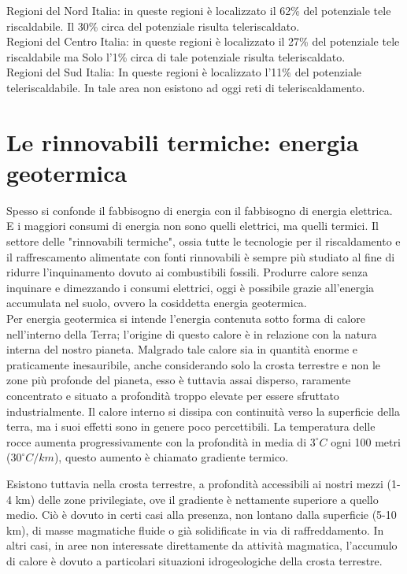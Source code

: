 \documentclass[laurea,oneside,11pt]{USiena_tesiLM3}
\begin{document}
Regioni del Nord Italia: in queste regioni è localizzato il 62\% del potenziale tele riscaldabile. Il 30\% circa del potenziale risulta teleriscaldato. \\

Regioni del Centro Italia: in queste regioni è localizzato il 27\% del potenziale tele riscaldabile ma Solo l'1\% circa di tale potenziale risulta teleriscaldato. \\

Regioni del Sud Italia: In queste regioni è localizzato l'11\% del potenziale teleriscaldabile. In tale area non esistono ad oggi reti di teleriscaldamento.

\section{Le rinnovabili termiche: energia geotermica}
Spesso si confonde il fabbisogno di energia con il fabbisogno di energia elettrica. E i maggiori consumi di energia non sono quelli elettrici, ma quelli termici. Il settore delle "rinnovabili termiche", ossia tutte le tecnologie per il riscaldamento e il raffrescamento alimentate con fonti rinnovabili è sempre più studiato  al fine di ridurre l'inquinamento dovuto ai combustibili fossili.
Produrre calore senza inquinare e dimezzando i consumi elettrici, oggi è possibile grazie all'energia accumulata nel suolo, ovvero la cosiddetta energia geotermica.\\

Per energia geotermica si intende l'energia contenuta sotto forma  di calore nell'interno della Terra; l'origine di questo calore è in relazione con la natura interna del nostro pianeta. Malgrado tale calore sia in quantità enorme e praticamente inesauribile, anche considerando solo la crosta terrestre e non le zone più profonde del pianeta, esso è tuttavia assai disperso, raramente concentrato e situato a profondità troppo elevate per essere sfruttato industrialmente. Il calore interno si dissipa con continuità verso la superficie della terra, ma i suoi effetti sono in genere poco percettibili. La temperatura delle rocce aumenta progressivamente con la profondità in media di $3 ^{\circ }C$ ogni 100 metri ($30 ^{\circ} C/km$), questo aumento è chiamato gradiente termico.

Esistono tuttavia nella crosta terrestre, a profondità accessibili ai nostri mezzi (1-4 km) delle zone privilegiate, ove il gradiente è nettamente superiore a quello medio. Ciò è dovuto in certi casi alla presenza, non lontano dalla superficie (5-10 km), di masse magmatiche fluide o già solidificate in via di raffreddamento. In altri casi, in aree non interessate direttamente da attività magmatica, l'accumulo di calore è dovuto a particolari situazioni idrogeologiche della crosta terrestre.
\end{document}

